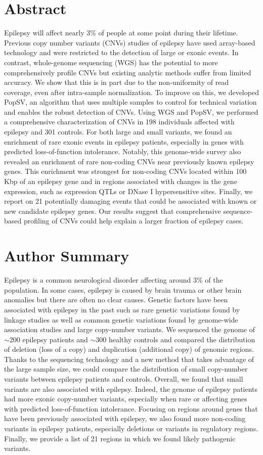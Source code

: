 \section{Abstract}
Epilepsy will affect nearly 3\% of people at some point during their lifetime. 
Previous copy number variants (CNVs) studies of epilepsy have used array-based technology and were restricted to the detection of large or exonic events. 
In contrast, whole-genome sequencing (WGS) has the potential to more comprehensively profile CNVs but existing analytic methods suffer from limited accuracy. 
We show that this is in part due to the non-uniformity of read coverage, even after intra-sample normalization. 
To improve on this, we developed {\sf PopSV}, an algorithm that uses multiple samples to control for technical variation and enables the robust detection of CNVs. 
Using WGS and {\sf PopSV}, we performed a comprehensive characterization of CNVs in 198 individuals affected with epilepsy and 301 controls. 
For both large and small variants, we found an enrichment of rare exonic events in epilepsy patients, especially in genes with predicted loss-of-function intolerance. 
Notably, this genome-wide survey also revealed an enrichment of rare non-coding CNVs near previously known epilepsy genes. 
This enrichment was strongest for non-coding CNVs located within 100 Kbp of an epilepsy gene and in regions associated with changes in the gene expression, such as expression QTLs or DNase I hypersensitive sites. 
Finally, we report on 21 potentially damaging events that could be associated with known or new candidate epilepsy genes. 
Our results suggest that comprehensive sequence-based profiling of CNVs could help explain a larger fraction of epilepsy cases. 


\section{Author Summary}
Epilepsy is a common neurological disorder affecting around 3\% of the population.
In some cases, epilepsy is caused by brain trauma or other brain anomalies but there are often no clear causes.
Genetic factors have been associated with epilepsy in the past such as rare genetic variations found by linkage studies as well as common genetic variations found by genome-wide association studies and large copy-number variants.
We sequenced the genome of $\sim$200 epilepsy patients and $\sim$300 healthy controls and compared the distribution of deletion (loss of a copy) and duplication (additional copy) of genomic regions.
Thanks to the sequencing technology and a new method that takes advantage of the large sample size, we could compare the distribution of small copy-number variants between epilepsy patients and controls.
Overall, we found that small variants are also associated with epilepsy.
Indeed, the genome of epilepsy patients had more exonic copy-number variants, especially when rare or affecting genes with predicted loss-of-function intolerance.
Focusing on regions around genes that have been previously associated with epilepsy, we also found more non-coding variants in epilepsy patients, especially deletions or variants in regulatory regions.
Finally, we provide a list of 21 regions in which we found likely pathogenic variants.

